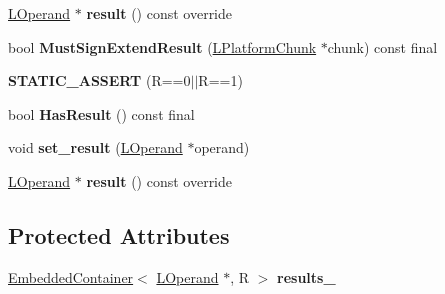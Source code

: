 \begin{DoxyCompactItemize}
\item 
\hyperlink{classv8_1_1internal_1_1_l_operand}{L\+Operand} $\ast$ {\bfseries result} () const  override\hypertarget{classv8_1_1internal_1_1_l_template_result_instruction_a7c8c6c4103da68a23b1138c1285e1c62}{}\label{classv8_1_1internal_1_1_l_template_result_instruction_a7c8c6c4103da68a23b1138c1285e1c62}

\item 
bool {\bfseries Must\+Sign\+Extend\+Result} (\hyperlink{classv8_1_1internal_1_1_l_platform_chunk}{L\+Platform\+Chunk} $\ast$chunk) const  final\hypertarget{classv8_1_1internal_1_1_l_template_result_instruction_a464f027fa3fb0095305435486e7537d0}{}\label{classv8_1_1internal_1_1_l_template_result_instruction_a464f027fa3fb0095305435486e7537d0}

\item 
{\bfseries S\+T\+A\+T\+I\+C\+\_\+\+A\+S\+S\+E\+RT} (R==0$\vert$$\vert$R==1)\hypertarget{classv8_1_1internal_1_1_l_template_result_instruction_ab50cf4fe551ff0d973c2ed909168ee2e}{}\label{classv8_1_1internal_1_1_l_template_result_instruction_ab50cf4fe551ff0d973c2ed909168ee2e}

\item 
bool {\bfseries Has\+Result} () const  final\hypertarget{classv8_1_1internal_1_1_l_template_result_instruction_aba80f9e6e2518590206acbabe8587c88}{}\label{classv8_1_1internal_1_1_l_template_result_instruction_aba80f9e6e2518590206acbabe8587c88}

\item 
void {\bfseries set\+\_\+result} (\hyperlink{classv8_1_1internal_1_1_l_operand}{L\+Operand} $\ast$operand)\hypertarget{classv8_1_1internal_1_1_l_template_result_instruction_a082db1f6cbcf9a05377ddee3727baf5f}{}\label{classv8_1_1internal_1_1_l_template_result_instruction_a082db1f6cbcf9a05377ddee3727baf5f}

\item 
\hyperlink{classv8_1_1internal_1_1_l_operand}{L\+Operand} $\ast$ {\bfseries result} () const  override\hypertarget{classv8_1_1internal_1_1_l_template_result_instruction_a7c8c6c4103da68a23b1138c1285e1c62}{}\label{classv8_1_1internal_1_1_l_template_result_instruction_a7c8c6c4103da68a23b1138c1285e1c62}

\end{DoxyCompactItemize}
\subsection*{Protected Attributes}
\begin{DoxyCompactItemize}
\item 
\hyperlink{classv8_1_1internal_1_1_embedded_container}{Embedded\+Container}$<$ \hyperlink{classv8_1_1internal_1_1_l_operand}{L\+Operand} $\ast$, R $>$ {\bfseries results\+\_\+}\hypertarget{classv8_1_1internal_1_1_l_template_result_instruction_a1b4f470877876ed512fd46fa0260d7fa}{}\label{classv8_1_1internal_1_1_l_template_result_instruction_a1b4f470877876ed512fd46fa0260d7fa}

\end{DoxyCompactItemize}
